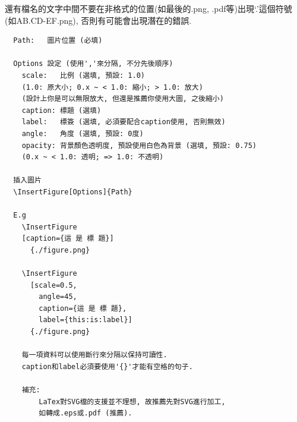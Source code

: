 還有檔名的文字中間不要在非格式的位置(如最後的.png, .pdf等)出現`.'這個符號 (如AB.CD-EF.png), 否則有可能會出現潛在的錯誤.

\newpage
{}
  
  \begin{DescriptionFrame}
  \begin{verbatim}
  Path:   圖片位置 (必填)

  Options 設定 (使用','來分隔, 不分先後順序)
    scale:   比例 (選填, 預設: 1.0)
    (1.0: 原大小; 0.x ~ < 1.0: 縮小; > 1.0: 放大)
    (設計上你是可以無限放大, 但還是推薦你使用大圖, 之後縮小)
    caption: 標題 (選填)
    label:   標簽 (選填, 必須要配合caption使用, 否則無效)
    angle:   角度 (選填, 預設: 0度)
    opacity: 背景顏色透明度, 預設使用白色為背景 (選填, 預設: 0.75)
    (0.x ~ < 1.0: 透明; => 1.0: 不透明)

  插入圖片
  \InsertFigure[Options]{Path}

  E.g
    \InsertFigure
    [caption={這 是 標 題}]
      {./figure.png}

    \InsertFigure
      [scale=0.5,
        angle=45,
        caption={這 是 標 題},
        label={this:is:label}]
      {./figure.png}

    每一項資料可以使用斷行來分隔以保持可讀性.
    caption和label必須要使用'{}'才能有空格的句子.

    補充:
        LaTex對SVG檔的支援並不理想, 故推薦先對SVG進行加工,
        如轉成.eps或.pdf (推薦).
  \end{verbatim}
  \end{DescriptionFrame}

